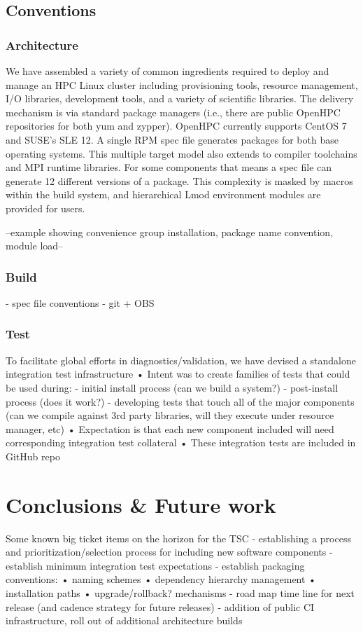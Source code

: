 \documentclass{sig-alternate-05-2015}
\begin{document}
\subsection{Conventions}
\subsubsection{Architecture}
We have assembled a variety of common ingredients required to deploy and manage 
an HPC Linux cluster including provisioning tools, resource management, I/O 
libraries, development tools, and a variety of scientific libraries. The 
delivery mechanism is via standard package managers (i.e., there are public 
OpenHPC repositories for both yum and zypper). OpenHPC currently supports CentOS
7 and SUSE's SLE 12. A single RPM spec file generates packages for both base
operating systems. This multiple target model also extends to compiler
toolchains and MPI runtime libraries. For some components that means a spec file
can generate 12 different versions of a package. This complexity is masked by
macros within the build system, and hierarchical Lmod environment modules are 
provided for users.

--example showing convenience group installation, package name convention, module
load--

\subsubsection{Build}

 - spec file conventions
 - git + OBS
 
\subsubsection{Test}
 To facilitate global efforts in diagnostics/validation, we have devised a standalone integration test infrastructure
 • Intent was to create families of tests that could be used during:
 - initial install process (can we build a system?)
 - post-install process (does it work?)
 - developing tests that touch all of the major components (can we compile against 3rd party libraries, will they execute under resource manager, etc)
 • Expectation is that each new component included will need corresponding integration test collateral
 • These integration tests are included in GitHub repo


\section{Conclusions \& Future work}
Some known big ticket items on the horizon for the TSC
- establishing a process and prioritization/selection process for including
new software components
- establish minimum integration test expectations
- establish packaging conventions:
• naming schemes
• dependency hierarchy management • installation paths
• upgrade/rollback? mechanisms
- road map time line for next release (and cadence strategy for future releases)
- addition of public CI infrastructure, roll out of additional architecture builds
\end{document}
